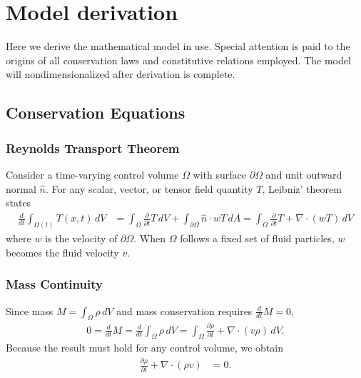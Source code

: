\documentclass[letterpaper,11pt,nointlimits]{amsart}
\begin{document}
\section{Model derivation}

Here we derive the mathematical model in use.  Special attention is
paid to the origins of all conservation laws and constitutive relations
employed.  The model will nondimensionalized after derivation is complete.

\subsection{Conservation Equations}

\subsubsection{Reynolds Transport Theorem}

Consider a time-varying control volume $\Omega$ with surface
$\partial\Omega$ and unit outward normal $\hat{n}$.  For any 
scalar, vector, or tensor field quantity
$T$, Leibniz' theorem states
\begin{align}
  \label{eq:rtt}
  \frac{d}{dt}\int_{\Omega(t)}T(x,t)\,dV
  &=
  \int_{\Omega}\frac{\partial}{\partial{}t}T\,dV
  +
  \int_{\partial\Omega} \hat{n}\cdot{}w T\,dA
  =
  \int_{\Omega}\frac{\partial}{\partial{}t}T+\nabla\cdot(wT)\,dV
\end{align}
where $w$ is the velocity of $\partial\Omega$.  When $\Omega$ follows
a fixed set of fluid particles, $w$ becomes the fluid velocity $v$.

\subsubsection{Mass Continuity} 
Since mass $M=\int_{\Omega} \rho\,dV$
and mass conservation requires $\frac{d}{dt}M=0$,
\begin{align}
  0 = \frac{d}{dt}M 
  = \frac{d}{dt}\int_{\Omega} \rho\,dV
  =
  \int_{\Omega}\frac{\partial\rho}{\partial{}t}+\nabla\cdot(v\rho{})\,dV.
\end{align}
Because the result must hold for any control volume, we obtain
\begin{align}
  \label{eq:cons_mass}
  \frac{\partial\rho}{\partial{}t}+\nabla\cdot(\rho{}v) &= 0
  .
\end{align}
\end{document}
